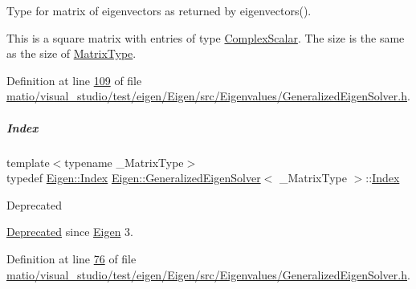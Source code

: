 Type for matrix of eigenvectors as returned by eigenvectors(). 

This is a square matrix with entries of type \hyperlink{group___eigenvalues___module_abdec07af91db1345bb4c74066e3d0ea7}{Complex\+Scalar}. The size is the same as the size of \hyperlink{group___eigenvalues___module_a56f4b9823bb9a267de3aaf48428cd247}{Matrix\+Type}. 

Definition at line \hyperlink{matio_2visual__studio_2test_2eigen_2_eigen_2src_2_eigenvalues_2_generalized_eigen_solver_8h_source_l00109}{109} of file \hyperlink{matio_2visual__studio_2test_2eigen_2_eigen_2src_2_eigenvalues_2_generalized_eigen_solver_8h_source}{matio/visual\+\_\+studio/test/eigen/\+Eigen/src/\+Eigenvalues/\+Generalized\+Eigen\+Solver.\+h}.

\mbox{\label{group___eigenvalues___module_a46a0ff3841059479ec314e56a5645302}} 
\subparagraph{\texorpdfstring{Index}{Index}\hspace{0.1cm}{\footnotesize\ttfamily [1/2]}}
{\footnotesize\ttfamily template$<$typename \+\_\+\+Matrix\+Type$>$ \\
typedef \hyperlink{namespace_eigen_a62e77e0933482dafde8fe197d9a2cfde}{Eigen\+::\+Index} \hyperlink{group___eigenvalues___module_class_eigen_1_1_generalized_eigen_solver}{Eigen\+::\+Generalized\+Eigen\+Solver}$<$ \+\_\+\+Matrix\+Type $>$\+::\hyperlink{group___eigenvalues___module_a46a0ff3841059479ec314e56a5645302}{Index}}

\begin{DoxyRefDesc}{Deprecated}
\item[\hyperlink{deprecated__deprecated000063}{Deprecated}]since \hyperlink{namespace_eigen}{Eigen} 3. \end{DoxyRefDesc}


Definition at line \hyperlink{matio_2visual__studio_2test_2eigen_2_eigen_2src_2_eigenvalues_2_generalized_eigen_solver_8h_source_l00076}{76} of file \hyperlink{matio_2visual__studio_2test_2eigen_2_eigen_2src_2_eigenvalues_2_generalized_eigen_solver_8h_source}{matio/visual\+\_\+studio/test/eigen/\+Eigen/src/\+Eigenvalues/\+Generalized\+Eigen\+Solver.\+h}.


